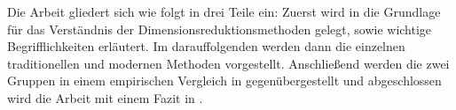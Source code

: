Die Arbeit gliedert sich wie folgt in drei Teile ein: Zuerst wird in
 die Grundlage für das Verständnis der Dimensionsreduktionsmethoden
gelegt, sowie wichtige Begrifflichkeiten erläutert. Im darauffolgenden
 werden dann die einzelnen traditionellen und modernen Methoden
vorgestellt. Anschließend werden die zwei Gruppen in einem empirischen Vergleich in
 gegenübergestellt und abgeschlossen wird die Arbeit mit einem Fazit in
.